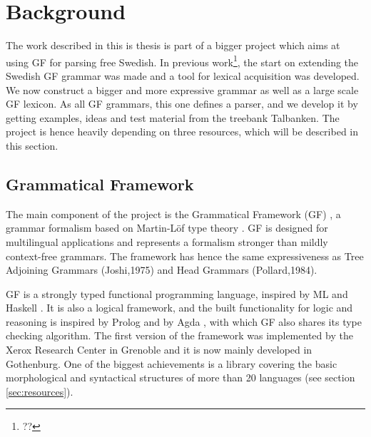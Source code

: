 \documentclass{report}
\begin{document}
\chapter{Background}  
\label{sec:background}
The work described in this is thesis is part of a bigger project which aims at
using GF for parsing free Swedish. 
In previous work\footnote{??}, the start on extending the Swedish GF grammar was
made and a tool for lexical acquisition was developed.
We now construct a bigger
and more expressive grammar as well as a large scale GF lexicon.
As all GF grammars, this one defines a parser, and we develop it by getting
examples, ideas and test material from the treebank Talbanken.
The project is hence heavily depending on three resources, which will be described
in this section.

\section{Grammatical Framework}
\label{sec:gf}
The main component of the project is the Grammatical Framework (GF) \cite{gfbok}, %
a grammar formalism based on Martin-Löf type theory \cite{martinlof}. GF is
designed for multilingual applications and represents a formalism
stronger than mildly context-free grammars. The framework has  hence the same expressiveness
as Tree Adjoining Grammars (Joshi,1975) and Head Grammars (Pollard,1984).

GF is a strongly typed functional programming language, inspired by
ML \cite{ml} and Haskell \cite{haskell}. It is also a logical framework,
and the built functionality for logic and reasoning 
is inspired by \textlambda Prolog \cite{prolog} and 
by Agda \cite{agda}, with which GF also shares its type checking algorithm.
The first version of the framework was implemented by the Xerox Research Center
in Grenoble and it is now mainly developed in Gothenburg. One of the biggest
achievements is a library covering the 
basic morphological and syntactical structures of more than
20 languages (see section \ref{sec:resources}).
\end{document}
